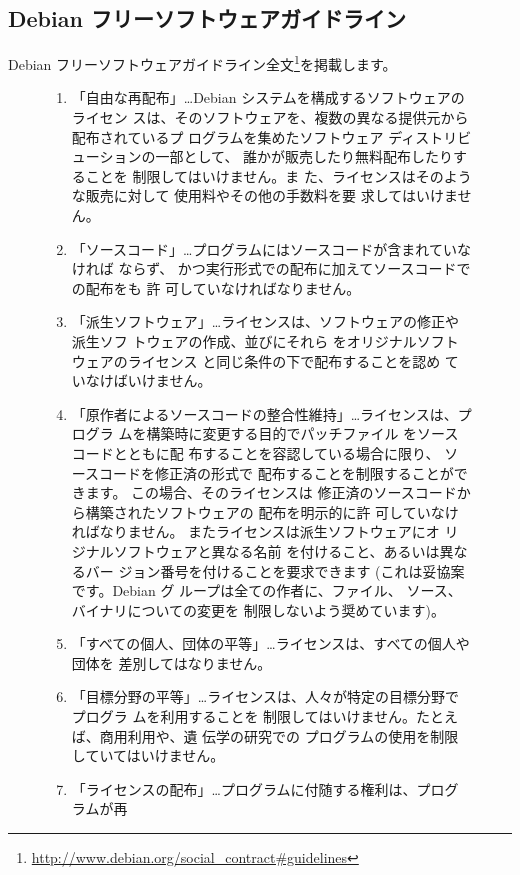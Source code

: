 \documentclass[mingoth,a4paper]{jsarticle}
\begin{document}
\subsection{Debian フリーソフトウェアガイドライン}
Debian フリーソフトウェアガイドライン全文\footnote{\url{http://www.debian.org/social\_contract\#guidelines}}を掲載します。

\begin{figure}[h]
 {\small
\begin{enumerate}
 \item 「自由な再配布」…Debian システムを構成するソフトウェアのライセン
       スは、そのソフトウェアを、複数の異なる提供元から配布されているプ
       ログラムを集めたソフトウェア ディストリビューションの一部として、
       誰かが販売したり無料配布したりすることを 制限してはいけません。ま
       た、ライセンスはそのような販売に対して 使用料やその他の手数料を要
       求してはいけません。
 \item 「ソースコード」…プログラムにはソースコードが含まれていなければ
       ならず、 かつ実行形式での配布に加えてソースコードでの配布をも 許
       可していなければなりません。
 \item 「派生ソフトウェア」…ライセンスは、ソフトウェアの修正や派生ソフ
       トウェアの作成、並びにそれら をオリジナルソフトウェアのライセンス
       と同じ条件の下で配布することを認め ていなけばいけません。
 \item 「原作者によるソースコードの整合性維持」…ライセンスは、プログラ
       ムを構築時に変更する目的でパッチファイル をソースコードとともに配
       布することを容認している場合に限り、 ソースコードを修正済の形式で
       配布することを制限することができます。 この場合、そのライセンスは
       修正済のソースコードから構築されたソフトウェアの 配布を明示的に許
       可していなければなりません。 またライセンスは派生ソフトウェアにオ
       リジナルソフトウェアと異なる名前 を付けること、あるいは異なるバー
       ジョン番号を付けることを要求できます (これは妥協案です。Debian グ
       ループは全ての作者に、ファイル、 ソース、バイナリについての変更を
       制限しないよう奨めています)。
 \item 「すべての個人、団体の平等」…ライセンスは、すべての個人や団体を
       差別してはなりません。
 \item 「目標分野の平等」…ライセンスは、人々が特定の目標分野でプログラ
       ムを利用することを 制限してはいけません。たとえば、商用利用や、遺
       伝学の研究での プログラムの使用を制限していてはいけません。
 \item 「ライセンスの配布」…プログラムに付随する権利は、プログラムが再

\end{enumerate}}
\end{figure}
\end{document}
